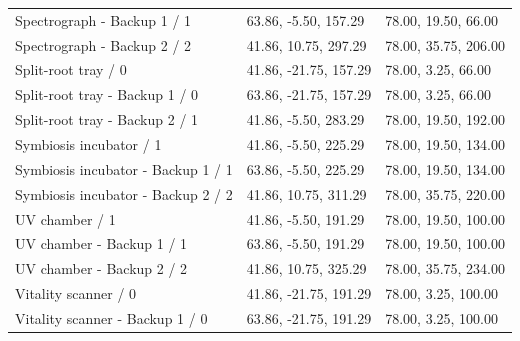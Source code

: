\begin{longtable}{p{}p{}p{}}
Spectrograph - Backup 1 /\allowbreak{} 1 & 63.\allowbreak{}86, -5.\allowbreak{}50, 157.\allowbreak{}29 & 78.\allowbreak{}00, 19.\allowbreak{}50, 66.\allowbreak{}00 \\
Spectrograph - Backup 2 /\allowbreak{} 2 & 41.\allowbreak{}86, 10.\allowbreak{}75, 297.\allowbreak{}29 & 78.\allowbreak{}00, 35.\allowbreak{}75, 206.\allowbreak{}00 \\
Split-root tray /\allowbreak{} 0 & 41.\allowbreak{}86, -21.\allowbreak{}75, 157.\allowbreak{}29 & 78.\allowbreak{}00, 3.\allowbreak{}25, 66.\allowbreak{}00 \\
Split-root tray - Backup 1 /\allowbreak{} 0 & 63.\allowbreak{}86, -21.\allowbreak{}75, 157.\allowbreak{}29 & 78.\allowbreak{}00, 3.\allowbreak{}25, 66.\allowbreak{}00 \\
Split-root tray - Backup 2 /\allowbreak{} 1 & 41.\allowbreak{}86, -5.\allowbreak{}50, 283.\allowbreak{}29 & 78.\allowbreak{}00, 19.\allowbreak{}50, 192.\allowbreak{}00 \\
Symbiosis incubator /\allowbreak{} 1 & 41.\allowbreak{}86, -5.\allowbreak{}50, 225.\allowbreak{}29 & 78.\allowbreak{}00, 19.\allowbreak{}50, 134.\allowbreak{}00 \\
Symbiosis incubator - Backup 1 /\allowbreak{} 1 & 63.\allowbreak{}86, -5.\allowbreak{}50, 225.\allowbreak{}29 & 78.\allowbreak{}00, 19.\allowbreak{}50, 134.\allowbreak{}00 \\
Symbiosis incubator - Backup 2 /\allowbreak{} 2 & 41.\allowbreak{}86, 10.\allowbreak{}75, 311.\allowbreak{}29 & 78.\allowbreak{}00, 35.\allowbreak{}75, 220.\allowbreak{}00 \\
UV chamber /\allowbreak{} 1 & 41.\allowbreak{}86, -5.\allowbreak{}50, 191.\allowbreak{}29 & 78.\allowbreak{}00, 19.\allowbreak{}50, 100.\allowbreak{}00 \\
UV chamber - Backup 1 /\allowbreak{} 1 & 63.\allowbreak{}86, -5.\allowbreak{}50, 191.\allowbreak{}29 & 78.\allowbreak{}00, 19.\allowbreak{}50, 100.\allowbreak{}00 \\
UV chamber - Backup 2 /\allowbreak{} 2 & 41.\allowbreak{}86, 10.\allowbreak{}75, 325.\allowbreak{}29 & 78.\allowbreak{}00, 35.\allowbreak{}75, 234.\allowbreak{}00 \\
Vitality scanner /\allowbreak{} 0 & 41.\allowbreak{}86, -21.\allowbreak{}75, 191.\allowbreak{}29 & 78.\allowbreak{}00, 3.\allowbreak{}25, 100.\allowbreak{}00 \\
Vitality scanner - Backup 1 /\allowbreak{} 0 & 63.\allowbreak{}86, -21.\allowbreak{}75, 191.\allowbreak{}29 & 78.\allowbreak{}00, 3.\allowbreak{}25, 100.\allowbreak{}00 \\

\end{longtable}
